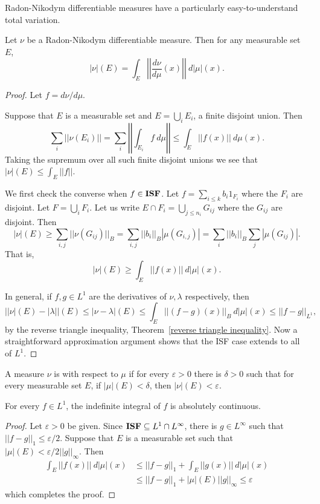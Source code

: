 Radon-Nikodym differentiable measures have a particularly easy-to-understand total variation.
\begin{theorem}
Let $\nu$ be a Radon-Nikodym differentiable measure. Then for any measurable set $E$,
\[|\nu|(E) = \int_{E} \left|\left|\frac{d\nu}{d\mu}(x)\right|\right|~d|\mu|(x).\]
\end{theorem}
\begin{proof}
Let $f = d\nu/d\mu$.

Suppose that $E$ is a measurable set and $E = \bigcup_{i} E_i$, a finite disjoint union. Then
\[\sum_{i} ||\nu(E_i)|| = \sum_{i} \left|\left| \int_{E_i} f~d\mu\right|\right| \leq \int_{E} ||f(x)||~d\mu(x).\]
Taking the supremum over all such finite disjoint unions we see that $|\nu|(E) \leq \int_{E} ||f||$.

We first check the converse when $f \in \mathbf{ISF}$. Let $f = \sum_{i \leq k} b_{i} 1_{F_i}$ where the $F_i$ are disjoint.
Let $F = \bigcup_{i} F_i$.
Let us write $E \cap F_{i} = \bigcup_{j \leq n_i} G_{ij}$ where the $G_{ij}$ are disjoint. Then
\[|\nu|(E) \geq \sum_{i,j} ||\nu(G_{ij})||_{B} = \sum_{i,j} ||b_i||_{B} |\mu(G_{i,j})| = \sum_{i} ||b_i||_{B} \sum_{j} |\mu(G_{ij})|.\]
That is,
\[|\nu|(E) \geq \int_{E} ||f(x)|| ~d|\mu|(x).\]

In general, if $f,g \in L^1$ are the derivatives of $\nu,\lambda$ respectively, then
\[||\nu|(E) - |\lambda||(E) \leq |\nu - \lambda|(E) \leq \int_{E} ||(f - g)(x)||_{B} ~d|\mu|(x) \leq ||f - g||_{L^1},\]
by the reverse triangle inequality, Theorem~\ref{reverse triangle inequality}.
Now a straightforward approximation argument shows that the ISF case extends to all of $L^1$.
\end{proof}

\begin{definition}
A measure $\nu$ is  with respect to $\mu$ if for every $\varepsilon > 0$ there is $\delta > 0$ such that for every measurable set $E$, if $|\mu|(E) < \delta$, then $|\nu|(E) < \varepsilon$.
\end{definition}

\begin{theorem}
\label{indefinite integral is abs cts}
For every $f \in L^1$, the indefinite integral of $f$ is absolutely continuous.
\end{theorem}
\begin{proof}
Let $\varepsilon > 0$ be given.
Since $\mathbf{ISF} \subseteq L^1 \cap L^\infty$, there is $g \in L^\infty$ such that $||f - g||_1 \leq \varepsilon/2$.
Suppose that $E$ is a measurable set such that $|\mu|(E) < \varepsilon/2||g||_\infty$. Then
\begin{align*}
\int_{E} ||f(x)|| ~d|\mu|(x) &\leq ||f - g||_1 + \int_{E} ||g(x)|| ~d|\mu|(x) \\
&\leq ||f - g||_1 + |\mu|(E)||g||_{\infty} \leq \varepsilon
\end{align*}
which completes the proof.
\end{proof}

